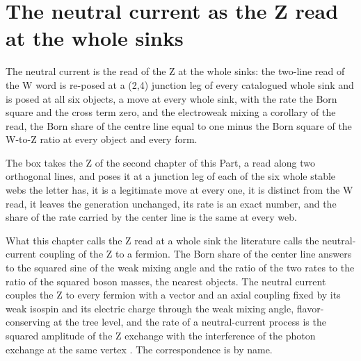 \section{The neutral current as the Z read at the whole sinks}\label{mod:VI-4-D538865-nczr-t1}
\begin{chtheorem}
The neutral current is the read of the Z at the whole sinks: the two-line read of the W word is re-posed at a (2,4) junction leg of every catalogued whole sink and is posed at all six objects, a move at every whole sink, with the rate the Born square and the cross term zero, and the electroweak mixing a corollary of the read, the Born share of the centre line equal to one minus the Born square of the W-to-Z ratio at every object and every form.
\end{chtheorem}
\chdeps{}{}
The box takes the Z of the second chapter of this Part, a read along two orthogonal lines, and poses it at a junction leg of each of the six whole stable webs the letter has, it is a legitimate move at every one, it is distinct from the W read, it leaves the generation unchanged, its rate is an exact number, and the share of the rate carried by the center line is the same at every web.
\begin{chbridge}
What this chapter calls the Z read at a whole sink the literature calls the neutral-current coupling of the Z to a fermion. The Born share of the center line answers to the squared sine of the weak mixing angle and the ratio of the two rates to the ratio of the squared boson masses, the nearest objects. The neutral current couples the Z to every fermion with a vector and an axial coupling fixed by its weak isospin and its electric charge through the weak mixing angle, flavor-conserving at the tree level, and the rate of a neutral-current process is the squared amplitude of the Z exchange with the interference of the photon exchange at the same vertex \cite{Weinberg1967,Hasert1973}. The correspondence is by name.
\end{chbridge}
